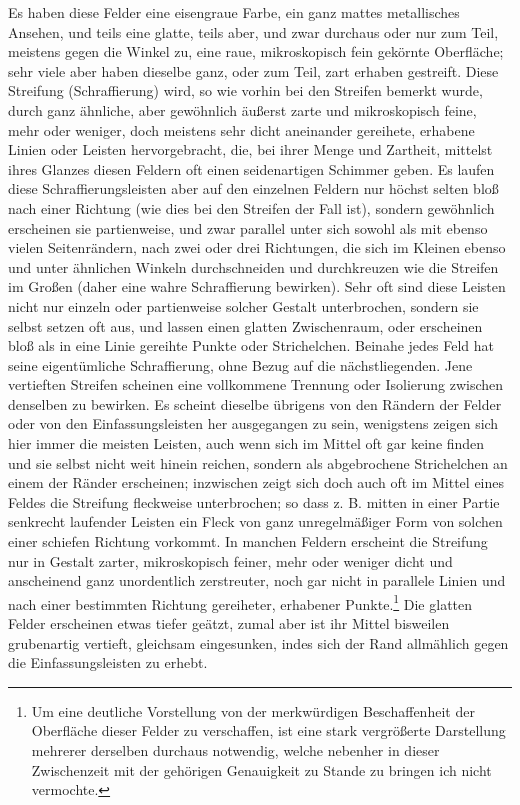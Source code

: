 \documentclass[a4paper, 11pt, oneside, german]{article}
\begin{document}
Es haben diese Felder eine eisengraue Farbe, ein ganz mattes metallisches Ansehen, und teils eine glatte, teils aber, und zwar durchaus oder nur zum Teil, meistens gegen die Winkel zu, eine raue, mikroskopisch fein gekörnte Oberfläche; sehr viele aber haben dieselbe ganz, oder zum Teil, zart erhaben gestreift. Diese Streifung (Schraffierung) wird, so wie vorhin bei den Streifen bemerkt wurde, durch ganz ähnliche, aber gewöhnlich äußerst zarte und mikroskopisch feine, mehr oder weniger, doch meistens sehr dicht aneinander gereihete, erhabene Linien oder Leisten hervorgebracht, die, bei ihrer Menge und Zartheit, mittelst ihres Glanzes diesen Feldern oft einen seidenartigen Schimmer geben. Es laufen diese Schraffierungsleisten aber auf den einzelnen Feldern nur höchst selten bloß nach einer Richtung (wie dies bei den Streifen der Fall ist), sondern gewöhnlich erscheinen sie partienweise, und zwar parallel unter sich sowohl als mit ebenso vielen Seitenrändern, nach zwei oder drei Richtungen, die sich im Kleinen ebenso und unter ähnlichen Winkeln durchschneiden und durchkreuzen wie die Streifen im Großen (daher eine wahre Schraffierung bewirken). Sehr oft sind diese Leisten nicht nur einzeln oder partienweise solcher Gestalt unterbrochen, sondern sie selbst setzen oft aus, und lassen einen glatten Zwischenraum, oder erscheinen bloß als in eine Linie gereihte Punkte oder Strichelchen. Beinahe jedes Feld hat seine eigentümliche Schraffierung, ohne Bezug auf die nächstliegenden. Jene vertieften Streifen scheinen eine vollkommene Trennung oder Isolierung zwischen denselben zu bewirken. Es scheint dieselbe übrigens von den Rändern der Felder oder von den Einfassungsleisten her ausgegangen zu sein, wenigstens zeigen sich hier immer die meisten Leisten, auch wenn sich im Mittel oft gar keine finden und sie selbst nicht weit hinein reichen, sondern als abgebrochene Strichelchen an einem der Ränder erscheinen; inzwischen zeigt sich doch auch oft im Mittel eines Feldes die Streifung fleckweise unterbrochen; so dass z. B. mitten in einer Partie senkrecht laufender Leisten ein Fleck von ganz unregelmäßiger Form von solchen einer schiefen Richtung vorkommt. In manchen Feldern erscheint die Streifung nur in Gestalt zarter, mikroskopisch feiner, mehr oder weniger dicht und anscheinend ganz unordentlich zerstreuter, noch gar nicht in parallele Linien und nach einer bestimmten Richtung gereiheter, erhabener Punkte.\footnote{Um eine deutliche Vorstellung von der merkwürdigen Beschaffenheit der Oberfläche dieser Felder zu verschaffen, ist eine stark vergrößerte Darstellung mehrerer derselben durchaus notwendig, welche nebenher in dieser Zwischenzeit mit der gehörigen Genauigkeit zu Stande zu bringen ich nicht vermochte.} Die glatten Felder erscheinen etwas tiefer geätzt, zumal aber ist ihr Mittel bisweilen grubenartig vertieft, gleichsam eingesunken, indes sich der Rand allmählich gegen die Einfassungsleisten zu erhebt.
\end{document}
